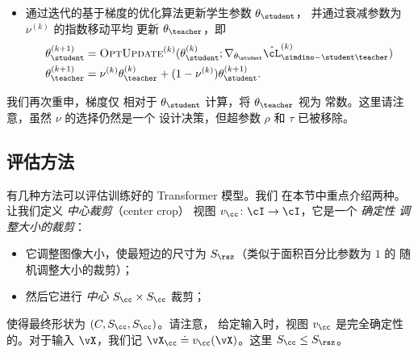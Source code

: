 \documentclass[../../book-main_zh.tex]{subfiles}
\begin{document}
\begin{itemize}
\begin{align}
{            1}^{M_{\loc}}d_{\ell^{2}}(\vz_{\theta_{\teacher}}(\vX_{b,
                g}^{(k), i}), \vz_{\theta_{\student}}(\vX_{b, \ell}^{(k),
            j})) \nonumber\\
            & + \sum_{j =
            1}^{M_{\glo}}d_{\ell^{2}}(\vz_{\theta_{\teacher}}(\vX_{b,
                g}^{(k), i}), \vz_{\theta_{\student}}(\vX_{b, g}^{(k),
        j}))\Bigg]\nonumber \\
        & - \frac{\gamma}{M_{\glo}}\sum_{i =
        1}^{M_{\glo}}R_{\eps}([\vz_{\theta_{\student}}(\vX_{1,
                g}^{(k), i}), \dots, \vz_{\theta_{\student}}(\vX_{B, g}^{(k),
        i})])\nonumber
    \end{align}
    其中 \(R_{\eps}\) 是在有限样本上估计的
    高斯编码率，在  中有描述。
    \(\hat{\cL}_{\simdino-\student\teacher}^{(k)}\) 相对于
    \(\theta_{\student}\) 的梯度应该（再次）在
    假设 \(\theta_{\teacher}\) 为常数的情况下计算。
\item 通过迭代的基于梯度的优化算法更新学生参数 \(\theta_{\student}\)，
    并通过衰减参数为 \(\nu^{(k)}\) 的指数移动平均
    更新 \(\theta_{\teacher}\)，即
    \begin{align}
        \theta_{\student}^{(k + 1)}
        &= \textsc{OptUpdate}^{(k)}(\theta_{\student}^{(k)};
        \nabla_{\theta_{\student}}\hat{\cL}_{\simdino-\student\teacher}^{(k)})
        \\
        \theta_{\teacher}^{(k + 1)}
        &= \nu^{(k)}\theta_{\teacher}^{(k)} + (1 -
        \nu^{(k)})\theta_{\student}^{(k + 1)}.
    \end{align}
\end{itemize}
我们再次重申，梯度仅
相对于 \(\theta_{\student}\) 计算，将 \(\theta_{\teacher}\) 视为
常数。这里请注意，虽然 \(\nu\) 的选择仍然是一个
设计决策，但超参数 \(\rho\) 和 \(\tau\) 已被移除。

\subsection{评估方法}\label{sub:contrastive_learning_evals}
有几种方法可以评估训练好的 Transformer 模型。我们
在本节中重点介绍两种。让我们定义 \textit{中心裁剪}（center crop）
视图 \(v_{\cc} \colon \cI \to \cI\)，它是一个 \textit{确定性
调整大小的裁剪}：
\begin{itemize}
\item 它调整图像大小，使最短边的尺寸为
    \(S_{\rsz}\)（类似于面积百分比参数为 \(1\) 的
    随机调整大小的裁剪）；
\item 然后它进行 \textit{中心} \(S_{\cc} \times S_{\cc}\) 裁剪；
\end{itemize}
使得最终形状为 \((C, S_{\cc}, S_{\cc})\)。请注意，
给定输入时，视图 \(v_{\cc}\) 是完全确定性的。对于输入 \(\vX\)，我们记 \(\vX_{\cc} \doteq v_{\cc}(\vX)\)。这里 \(S_{\cc} \leq S_{\rsz}\)。
\end{document}
